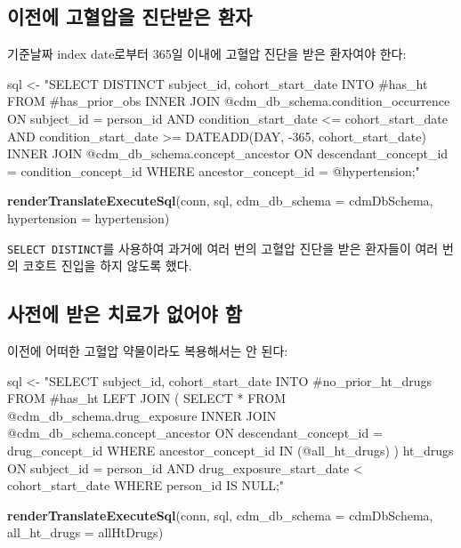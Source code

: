 \documentclass[11pt]{book}
\newenvironment{Shaded}{\begin{snugshade}}{\end{snugshade}}
\newcommand{\KeywordTok}[1]{\textcolor[rgb]{0.13,0.29,0.53}{\textbf{#1}}}
\newcommand{\DataTypeTok}[1]{\textcolor[rgb]{0.13,0.29,0.53}{#1}}
\newcommand{\StringTok}[1]{\textcolor[rgb]{0.31,0.60,0.02}{#1}}
\newcommand{\NormalTok}[1]{#1}
\theoremstyle{definition}
\theoremstyle{definition}
\theoremstyle{definition}
\theoremstyle{remark}
\begin{document}
\subsection{이전에 고혈압을 진단받은 환자}\label{---}

기준날짜 index date로부터 365일 이내에 고혈압 진단을 받은 환자여야 한다:

\begin{Shaded}
\begin{Highlighting}[]
\NormalTok{sql <-}\StringTok{ "SELECT DISTINCT subject_id,}
\StringTok{  cohort_start_date}
\StringTok{INTO #has_ht}
\StringTok{FROM #has_prior_obs}
\StringTok{INNER JOIN @cdm_db_schema.condition_occurrence}
\StringTok{  ON subject_id = person_id}
\StringTok{    AND condition_start_date <= cohort_start_date}
\StringTok{    AND condition_start_date >= DATEADD(DAY, -365, cohort_start_date)}
\StringTok{INNER JOIN @cdm_db_schema.concept_ancestor}
\StringTok{  ON descendant_concept_id = condition_concept_id}
\StringTok{WHERE ancestor_concept_id = @hypertension;"}

\KeywordTok{renderTranslateExecuteSql}\NormalTok{(conn,}
\NormalTok{                          sql,}
                          \DataTypeTok{cdm_db_schema =}\NormalTok{ cdmDbSchema,}
                          \DataTypeTok{hypertension =}\NormalTok{ hypertension)}
\end{Highlighting}
\end{Shaded}

\texttt{SELECT\ DISTINCT}를 사용하여 과거에 여러 번의 고혈압 진단을 받은
환자들이 여러 번의 코호트 진입을 하지 않도록 했다.

\subsection{사전에 받은 치료가 없어야 함}\label{----}

이전에 어떠한 고혈압 약물이라도 복용해서는 안 된다:

\begin{Shaded}
\begin{Highlighting}[]
\NormalTok{sql <-}\StringTok{ "SELECT subject_id,}
\StringTok{  cohort_start_date}
\StringTok{INTO #no_prior_ht_drugs}
\StringTok{FROM #has_ht}
\StringTok{LEFT JOIN (}
\StringTok{  SELECT *}
\StringTok{  FROM @cdm_db_schema.drug_exposure}
\StringTok{  INNER JOIN @cdm_db_schema.concept_ancestor}
\StringTok{    ON descendant_concept_id = drug_concept_id}
\StringTok{  WHERE ancestor_concept_id IN (@all_ht_drugs)}
\StringTok{) ht_drugs}
\StringTok{  ON subject_id = person_id}
\StringTok{    AND drug_exposure_start_date < cohort_start_date}
\StringTok{WHERE person_id IS NULL;"}

\KeywordTok{renderTranslateExecuteSql}\NormalTok{(conn,}
\NormalTok{                          sql,}
                          \DataTypeTok{cdm_db_schema =}\NormalTok{ cdmDbSchema,}
                          \DataTypeTok{all_ht_drugs =}\NormalTok{ allHtDrugs)}
\end{Highlighting}
\end{Shaded}
\end{document}
